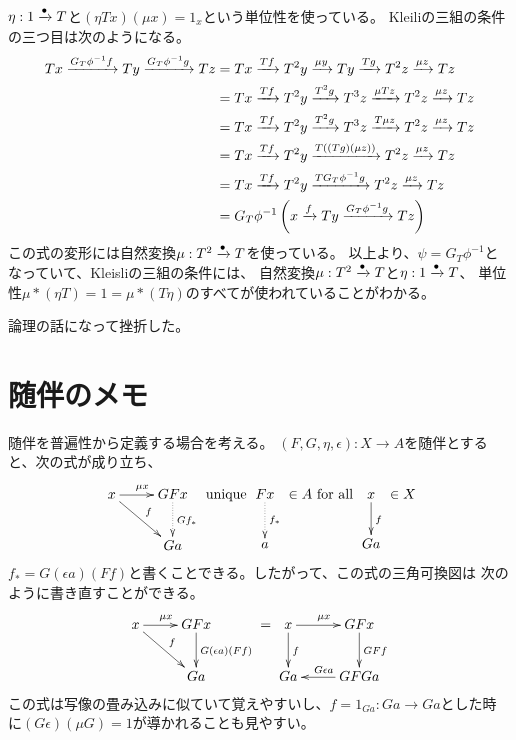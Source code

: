 {	$\eta:1\xrightarrow[{}]{\bullet}T$と$(\eta Tx)(\mu x)=1_x$という単位性を使っている。
	Kleiliの三組の条件の三つ目は次のようになる。
	\begin{equation*}\begin{split}
		Tx\xrightarrow[{}]{G_T\phi^{-1}f}Ty\xrightarrow[{}]{G_T\phi^{-1}g}Tz
		&= Tx\xrightarrow[{}]{Tf}T^2y\xrightarrow[{}]{\mu y}Ty\xrightarrow[{}]{Tg}T^2z\xrightarrow[{}]{\mu z}Tz \\
		&= Tx\xrightarrow[{}]{Tf}T^2y\xrightarrow[{}]{T^2 g}T^3z\xrightarrow[{}]{\mu Tz}T^2z\xrightarrow[{}]{\mu z}Tz \\
		&= Tx\xrightarrow[{}]{Tf}T^2y\xrightarrow[{}]{T^2 g}T^3z\xrightarrow[{}]{T\mu z}T^2z\xrightarrow[{}]{\mu z}Tz \\
		&= Tx\xrightarrow[{}]{Tf}T^2y\xrightarrow[{}]{T\mathinner{\left({(Tg)(\mu z)}\right)}}T^2z\xrightarrow[{}]{\mu z}Tz \\
		&= Tx\xrightarrow[{}]{Tf}T^2y\xrightarrow[{}]{TG_T\phi^{-1}g}T^2z\xrightarrow[{}]{\mu z}Tz \\
		&= G_T\phi^{-1}\mathinner{\left({x\ensuremath{\xrightarrow[{}]{f}}Ty\ensuremath{\xrightarrow[{}]{G_T\phi^{-1}g}}Tz}\right)}
	\end{split}\end{equation*}
	この式の変形には自然変換$\mu:T^2\xrightarrow[{}]{\bullet}T$を使っている。
	以上より、$\psi=G_T\phi^{-1}$となっていて、Kleisliの三組の条件には、
	自然変換$\mu:T^2\xrightarrow[{}]{\bullet}T$と$\eta:1\xrightarrow[{}]{\bullet}T$、
	単位性$\mu*(\eta T)=1=\mu*(T\eta)$のすべてが使われていることがわかる。

	論理の話になって挫折した。
\section{随伴のメモ}\label{s1:随伴のメモ} %
	随伴を普遍性から定義する場合を考える。
	$(F,G,\eta,\epsilon):X\to A$を随伴とすると、次の式が成り立ち、
	\begin{equation*}\begin{split}
		\xymatrix{
			x \ar[r]^{\mu x} \ar[rd]^f & GFx \ar@{.>}[d]^{Gf_*} \\ & Ga
		} \text{ unique } \xymatrix{
			Fx \ar@{.>}[d]^{f_*} \\ a
		} \in A \text{ for all } \xymatrix{
			x \ar[d]^f \\ Ga
		} \in X
	\end{split}\end{equation*}
	$f_*=G(\epsilon a)(Ff)$と書くことできる。したがって、この式の三角可換図は
	次のように書き直すことができる。
	\begin{equation*}\begin{split}
		\xymatrix{
			x \ar[r]^{\mu x} \ar[rd]^f & GFx \ar[d]^{G(\epsilon a)(Ff)} \\ & Ga
		} = \xymatrix{
			x \ar[r]^{\mu x} \ar[d]^f & GFx \ar[d]^{GFf} \\
			Ga & GFGa \ar[l]_{G\epsilon a}
		}
	\end{split}\end{equation*}
	この式は写像の畳み込みに似ていて覚えやすいし、$f=1_{Ga}:Ga\to Ga$とした時
	に$(G\epsilon)(\mu G)=1$が導かれることも見やすい。
}
